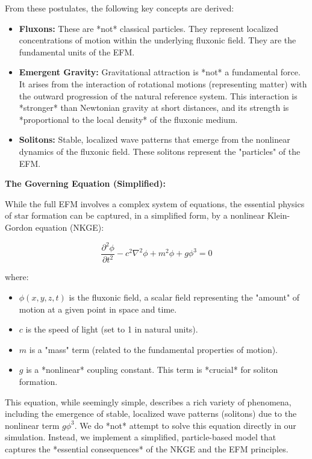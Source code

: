 \documentclass[11pt]{article}
\begin{document}
From these postulates, the following key concepts are derived:

\begin{itemize}
    \item \textbf{Fluxons:} These are *not* classical particles. They represent localized concentrations of motion within the underlying fluxonic field. They are the fundamental units of the EFM.
    \item \textbf{Emergent Gravity:} Gravitational attraction is *not* a fundamental force. It arises from the interaction of rotational motions (representing matter) with the outward progression of the natural reference system. This interaction is *stronger* than Newtonian gravity at short distances, and its strength is *proportional to the local density* of the fluxonic medium.
    \item \textbf{Solitons:} Stable, localized wave patterns that emerge from the nonlinear dynamics of the fluxonic field. These solitons represent the "particles" of the EFM.
\end{itemize}

\textbf{The Governing Equation (Simplified):}

While the full EFM involves a complex system of equations, the essential physics of star formation can be captured, in a simplified form, by a nonlinear Klein-Gordon equation (NKGE):

\begin{equation}
\frac{\partial^2 \phi}{\partial t^2} - c^2 \nabla^2 \phi + m^2 \phi + g \phi^3 = 0
\label{eq:nkge}
\end{equation}

where:

\begin{itemize}
    \item \(\phi(x, y, z, t)\) is the fluxonic field, a scalar field representing the "amount" of motion at a given point in space and time.
    \item \(c\) is the speed of light (set to 1 in natural units).
    \item \(m\) is a "mass" term (related to the fundamental properties of motion).
    \item \(g\) is a *nonlinear* coupling constant. This term is *crucial* for soliton formation.
\end{itemize}

This equation, while seemingly simple, describes a rich variety of phenomena, including the emergence of stable, localized wave patterns (solitons) due to the nonlinear term \(g \phi^3\). We do *not* attempt to solve this equation directly in our simulation. Instead, we implement a simplified, particle-based model that captures the *essential consequences* of the NKGE and the EFM principles.
\end{document}
